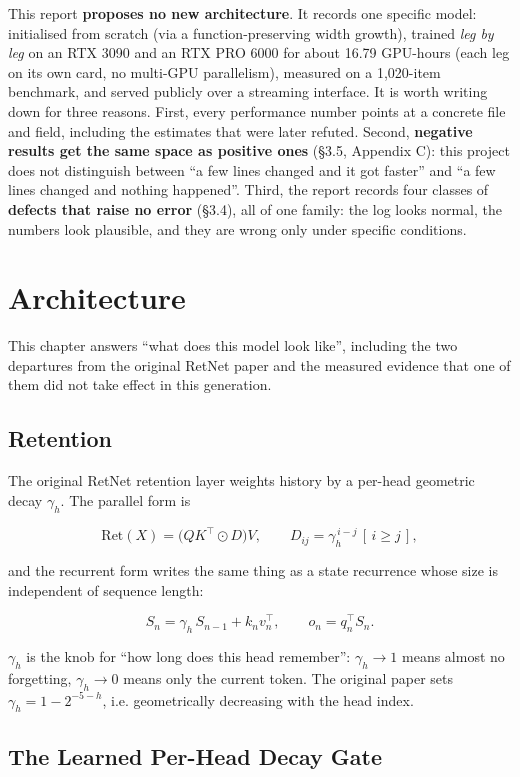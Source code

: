 \documentclass[11pt,openany]{article}
\begin{document}
This report \textbf{proposes no new architecture}. It records one specific model: initialised
from scratch (via a function-preserving width growth), trained \emph{leg by leg} on an RTX 3090
and an RTX PRO 6000 for about 16.79 GPU-hours (each leg on its own card, no multi-GPU
parallelism), measured on a 1{,}020-item benchmark, and served publicly over a streaming
interface. It is worth writing down for three reasons. First, every performance number points at
a concrete file and field, including the estimates that were later refuted. Second,
\textbf{negative results get the same space as positive ones} (\S3.5, Appendix C): this project
does not distinguish between ``a few lines changed and it got faster'' and ``a few lines changed
and nothing happened''. Third, the report records four classes of \textbf{defects that raise no
error} (\S3.4), all of one family: the log looks normal, the numbers look plausible, and they are
wrong only under specific conditions.

\section{Architecture}

This chapter answers ``what does this model look like'', including the two departures from the
original RetNet paper and the measured evidence that one of them did not take effect in this
generation.

\subsection{Retention}

The original RetNet retention layer weights history by a per-head geometric decay $\gamma_h$.
The parallel form is

\[
\mathrm{Ret}(X)=\big(QK^{\top}\odot D\big)V,\qquad D_{ij}=\gamma_h^{\,i-j}\,[\,i\ge j\,],
\]

and the recurrent form writes the same thing as a state recurrence whose size is independent of
sequence length:

\[
S_n=\gamma_h\,S_{n-1}+k_n v_n^{\top},\qquad o_n=q_n^{\top}S_n .
\]

$\gamma_h$ is the knob for ``how long does this head remember'': $\gamma_h\to1$ means almost no
forgetting, $\gamma_h\to0$ means only the current token. The original paper sets
$\gamma_h=1-2^{-5-h}$, i.e. geometrically decreasing with the head index.

\subsection{The Learned Per-Head Decay Gate}
\end{document}
